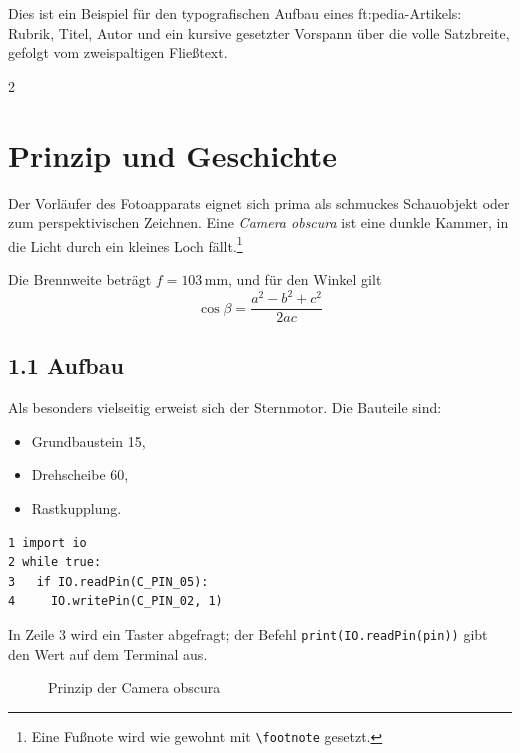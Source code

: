 \documentclass{ftpedia}
\begin{document}
\artikelkopf

\begin{ftabstract}
Dies ist ein Beispiel für den typografischen Aufbau eines ft:pedia-Artikels:
Rubrik, Titel, Autor und ein kursive gesetzter Vorspann über die volle
Satzbreite, gefolgt vom zweispaltigen Fließtext.
\end{ftabstract}

\begin{multicols}{2}

\section{Prinzip und Geschichte}

Der Vorläufer des Fotoapparats eignet sich prima als schmuckes Schauobjekt
oder zum perspektivischen Zeichnen. Eine \emph{Camera obscura} ist eine dunkle
Kammer, in die Licht durch ein kleines Loch fällt.\footnote{Eine Fußnote wird
wie gewohnt mit \texttt{\textbackslash footnote} gesetzt.}

Die Brennweite beträgt $f = 103\,\mathrm{mm}$, und für den Winkel gilt
\begin{equation}
  \cos\beta = \frac{a^{2}-b^{2}+c^{2}}{2ac} \tag{1}
\end{equation}

\subsection{1.1 Aufbau}

Als besonders vielseitig erweist sich der Sternmotor. Die Bauteile sind:

\begin{itemize}
  \item Grundbaustein 15,
  \item Drehscheibe 60,
  \item Rastkupplung.
\end{itemize}

\begin{lstlisting}
1 import io
2 while true:
3   if IO.readPin(C_PIN_05):
4     IO.writePin(C_PIN_02, 1)
\end{lstlisting}

In Zeile 3 wird ein Taster abgefragt; der Befehl
\texttt{print(IO.readPin(pin))} gibt den Wert auf dem Terminal aus.

\begin{figure}[H]
  \centering
  \caption{Prinzip der Camera obscura}
\end{figure}


\end{multicols}
\end{document}
